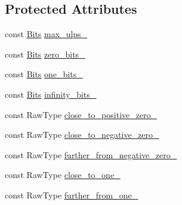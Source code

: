 \subsection*{Protected Attributes}
\begin{DoxyCompactItemize}
\item 
const \mbox{\hyperlink{classtesting_1_1gmock__matchers__test_1_1FloatingPointTest_addf899bd832ae51103198d201d2f2ea2}{Bits}} \mbox{\hyperlink{classtesting_1_1gmock__matchers__test_1_1FloatingPointTest_a06a8b1532af8e5a44aa0af8f73aba8fd}{max\+\_\+ulps\+\_\+}}
\item 
const \mbox{\hyperlink{classtesting_1_1gmock__matchers__test_1_1FloatingPointTest_addf899bd832ae51103198d201d2f2ea2}{Bits}} \mbox{\hyperlink{classtesting_1_1gmock__matchers__test_1_1FloatingPointTest_afb9b6beb1f152693155cf7db4e1fc4d2}{zero\+\_\+bits\+\_\+}}
\item 
const \mbox{\hyperlink{classtesting_1_1gmock__matchers__test_1_1FloatingPointTest_addf899bd832ae51103198d201d2f2ea2}{Bits}} \mbox{\hyperlink{classtesting_1_1gmock__matchers__test_1_1FloatingPointTest_ae26de8492d307d2b4c30f6b952d9a412}{one\+\_\+bits\+\_\+}}
\item 
const \mbox{\hyperlink{classtesting_1_1gmock__matchers__test_1_1FloatingPointTest_addf899bd832ae51103198d201d2f2ea2}{Bits}} \mbox{\hyperlink{classtesting_1_1gmock__matchers__test_1_1FloatingPointTest_a3c25f403d51e6c8ed3fe7856cab1330b}{infinity\+\_\+bits\+\_\+}}
\item 
const Raw\+Type \mbox{\hyperlink{classtesting_1_1gmock__matchers__test_1_1FloatingPointTest_a750555206ab9d5959d6dc84f8a760c57}{close\+\_\+to\+\_\+positive\+\_\+zero\+\_\+}}
\item 
const Raw\+Type \mbox{\hyperlink{classtesting_1_1gmock__matchers__test_1_1FloatingPointTest_a641f5e223c25b6d6fb108b322acaa39d}{close\+\_\+to\+\_\+negative\+\_\+zero\+\_\+}}
\item 
const Raw\+Type \mbox{\hyperlink{classtesting_1_1gmock__matchers__test_1_1FloatingPointTest_acc020c4d830d9e9d910b92bb466d540f}{further\+\_\+from\+\_\+negative\+\_\+zero\+\_\+}}
\item 
const Raw\+Type \mbox{\hyperlink{classtesting_1_1gmock__matchers__test_1_1FloatingPointTest_a34c97dc5dc07ea62764de87fdd8b7764}{close\+\_\+to\+\_\+one\+\_\+}}
\item 
const Raw\+Type \mbox{\hyperlink{classtesting_1_1gmock__matchers__test_1_1FloatingPointTest_a049ba2d5d371e8aea6ada1ab5312b1bb}{further\+\_\+from\+\_\+one\+\_\+}}
\item 

\end{DoxyCompactItemize}
